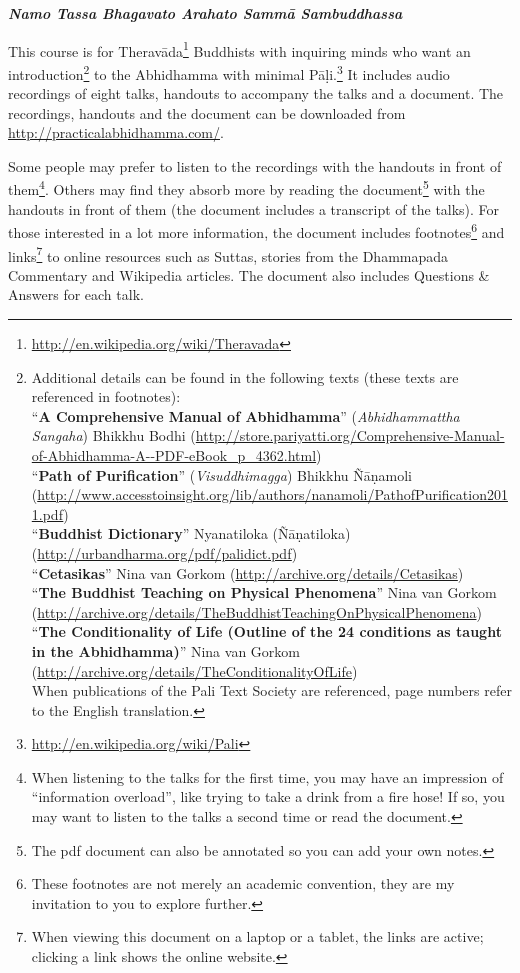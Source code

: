 \begin{center}
\textbf{\textit{Namo Tassa Bhagavato Arahato Sammā Sambuddhassa}} \\
\end{center}

This course is for Theravāda\footnote{\url{http://en.wikipedia.org/wiki/Theravada}} Buddhists with inquiring minds who want an introduction\footnote{Additional details can be found in the following texts (these texts are referenced in footnotes):\\
“\textbf{A Comprehensive Manual of Abhidhamma}” (\textit{Abhidhammattha Sangaha}) Bhikkhu Bodhi (\url{http://store.pariyatti.org/Comprehensive-Manual-of-Abhidhamma-A--PDF-eBook_p_4362.html})\\
“\textbf{Path of Purification}” (\textit{Visuddhimagga}) Bhikkhu Ñāṇamoli (\url{http://www.accesstoinsight.org/lib/authors/nanamoli/PathofPurification2011.pdf})\\
“\textbf{Buddhist Dictionary}” Nyanatiloka (Ñāṇatiloka) (\url{http://urbandharma.org/pdf/palidict.pdf})\\
“\textbf{Cetasikas}” Nina van Gorkom (\url{http://archive.org/details/Cetasikas})\\
“\textbf{The Buddhist Teaching on Physical Phenomena}” Nina van Gorkom (\url{http://archive.org/details/TheBuddhistTeachingOnPhysicalPhenomena})\\
“\textbf{The Conditionality of Life (Outline of the 24 conditions as taught in the Abhidhamma)}” Nina van Gorkom (\url{http://archive.org/details/TheConditionalityOfLife})\\
When publications of the Pali Text Society are referenced, page numbers refer to the English translation.} to the Abhidhamma with minimal Pāḷi.\footnote{\url{http://en.wikipedia.org/wiki/Pali}} It includes audio recordings of eight talks, handouts to accompany the talks and a document. The recordings, handouts and the document can be downloaded from \url{http://practicalabhidhamma.com/}.

Some people may prefer to listen to the recordings with the handouts in front of them\footnote{When listening to the talks for the first time, you may have an impression of “information overload”, like trying to take a drink from a fire hose! \smiley  If so, you may want to listen to the talks a second time or read the document.}. Others may find they absorb more by reading the document\footnote{The pdf document can also be annotated so you can add your own notes.} with the handouts in front of them (the document includes a transcript of the talks). For those interested in a lot more information, the document includes footnotes\footnote{These footnotes are not merely an academic convention, they are my invitation to you to explore further.} and links\footnote{When viewing this document on a laptop or a tablet, the links are active; clicking a link shows the online website.} to online resources such as Suttas, stories from the Dhammapada Commentary and Wikipedia articles. The document also includes Questions \& Answers for each talk. 

